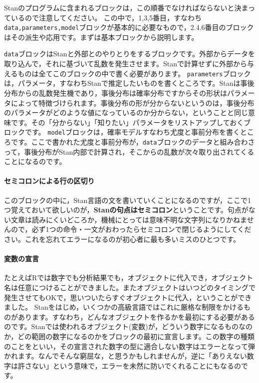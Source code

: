 \documentclass{ltjsbook}
\begin{document}
Stanのプログラムに含まれるブロックは，この順番でなければならないと決まっているので注意してください。
この中で，1,3,5番目，すなわち\texttt{data,parameters,model}ブロックが基本的に必要なもので，2.4.6番目のブロックはその派生や応用です。まずは基本ブロックから説明します。

\texttt{data}ブロックはStanと外部とのやりとりをするブロックです。外部からデータを取り込んで，それに基づいて乱数を発生させます。Stanで計算せずに外部から与えるものは全てこのブロックの中で書く必要があります。
\texttt{parameters}ブロックは，パラメータ，すなわちStanで推定したいものを書くところです。Stanは事後分布からの乱数発生機であり，事後分布は確率分布ですからその形状はパラメータによって特徴づけられます。事後分布の形が分からないというのは，事後分布のパラメータがどのような値になっているのか分からない，ということと同じ意味です。その「分からない」「知りたい」パラメータをリストアップしておくブロックです。
\texttt{model}ブロックは，確率モデルすなわち尤度と事前分布を書くところです。ここで書かれた尤度と事前分布が，\texttt{data}ブロックのデータと組み合わさって，事後分布がStan内部で計算され，そこからの乱数が次々取り出されてくることになるのです。

\paragraph{セミコロンによる行の区切り}
このブロックの中に，Stan言語の文を書いていくことになるのですが，ここで1つ覚えておいて欲しいのが，\textbf{Stanの句点はセミコロン}ということです。句点がない文章は読みにくいどころか，機械にとっては意味不明な文字列になりかねませんので，必ず1つの命令・一文がおわったらセミコロンで閉じるようにしてください。これを忘れてエラーになるのが初心者に最も多いミスのひとつです。

\paragraph{変数の宣言}
たとえばRでは数字でも分析結果でも，オブジェクトに代入でき，オブジェクト名は任意につけることができました。またオブジェクトはいつどのタイミングで発生させてもOKで，思いついたらすぐオブジェクトに代入，ということができました。
Stanをはじめ，いくつかの高級言語ではこれに厳格な制限をかけるものがあります。すなわち，どんなオブジェクトを作るかを最初にする必要があるのです。Stanでは使われるオブジェクト(変数)が，どういう数字になるものなのか，どの範囲の数字になるのかをブロックの最初に宣言します。この数字の種類のことをといい，その宣言された数字の型に適合しない数字はエラーとなって弾かれます。なんでそんな窮屈な，と思うかもしれませんが，逆に「ありえない数字は許さない」という意味で，エラーを未然に防いでくれることにもなるのです。
\end{document}
